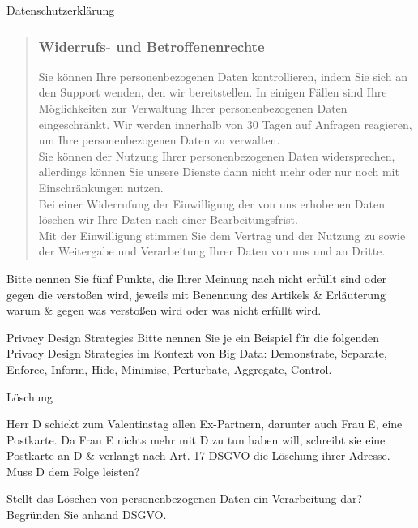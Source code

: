 \documentclass{exercisesheet}
\begin{document}
\begin{exercise}{Datenschutzerklärung}
\begin{quote}
    \subsubsection*{Widerrufs- und Betroffenenrechte}
    Sie können Ihre personenbezogenen Daten kontrollieren, indem Sie sich an den Support wenden, den wir bereitstellen. In einigen Fällen sind Ihre Möglichkeiten zur Verwaltung Ihrer personenbezogenen Daten eingeschränkt. Wir werden innerhalb von 30 Tagen auf Anfragen reagieren, um Ihre personenbezogenen Daten zu verwalten.\\
    Sie können der Nutzung Ihrer personenbezogenen Daten widersprechen, allerdings können Sie unsere Dienste dann nicht mehr oder nur noch mit Einschränkungen nutzen.\\
    Bei einer Widerrufung der Einwilligung der von uns erhobenen Daten löschen wir Ihre Daten nach einer Bearbeitungsfrist.
    \vspace{1em}\\
    Mit der Einwilligung stimmen Sie dem Vertrag und der Nutzung zu sowie der Weitergabe und Verarbeitung Ihrer Daten von uns und an Dritte.
  \end{quote}

  Bitte nennen Sie fünf Punkte, die Ihrer Meinung nach nicht erfüllt sind oder gegen die verstoßen wird, jeweils mit Benennung des Artikels \& Erläuterung warum \& gegen was verstoßen wird oder was nicht erfüllt wird.
\end{exercise}

\begin{exercise}{Privacy Design Strategies}
  Bitte nennen Sie je ein Beispiel für die folgenden Privacy Design Strategies im Kontext von Big Data: Demonstrate, Separate, Enforce, Inform, Hide, Minimise, Perturbate, Aggregate, Control.
\end{exercise}

\begin{exercises}{Löschung}
\item Herr D schickt zum Valentinstag allen Ex-Partnern, darunter auch Frau E, eine Postkarte. Da Frau E nichts mehr mit D zu tun haben will, schreibt sie eine Postkarte an D \& verlangt nach Art. 17 DSGVO die Löschung ihrer Adresse. Muss D dem Folge leisten?
\item Stellt das Löschen von personenbezogenen Daten ein Verarbeitung dar? Begründen Sie anhand DSGVO.
\end{exercises}
\end{document}
